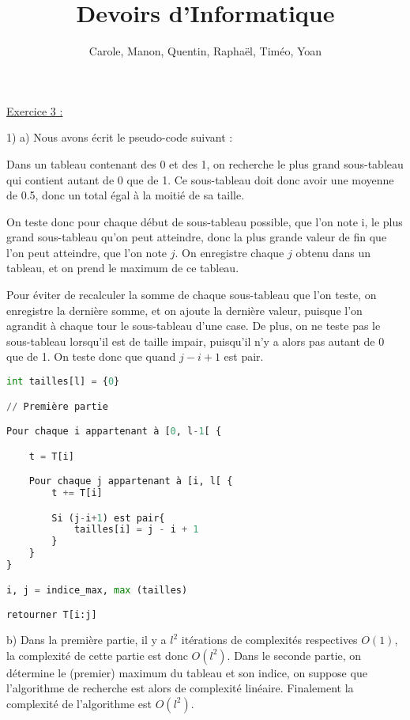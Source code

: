 \documentclass{article}
\title{Devoirs d'Informatique}
\author{Carole, Manon, Quentin, Raphaël, Timéo, Yoan}
\begin{document}
\maketitle

\underline{Exercice 3 :}

\bigskip
\bigskip
\bigskip

1) a) Nous avons écrit le pseudo-code suivant :

\bigskip
\bigskip

Dans un tableau contenant des 0 et des 1, on recherche le plus grand sous-tableau qui contient autant de 0 que de 1. Ce sous-tableau doit donc avoir une moyenne de 0.5, donc un total égal à la moitié de sa taille.

On teste donc pour chaque début de sous-tableau possible, que l'on note i, le plus grand sous-tableau qu'on peut atteindre, donc la plus grande valeur de fin que l'on peut atteindre, que l'on note $j$. On enregistre chaque $j$ obtenu dans un tableau, et on prend le maximum de ce tableau.


Pour éviter de recalculer la somme de chaque sous-tableau que l'on teste, on enregistre la dernière somme, et on ajoute la dernière valeur, puisque l'on agrandit à chaque tour le sous-tableau d'une case. De plus, on ne teste pas le sous-tableau lorsqu'il est de taille impair, puisqu'il n'y a alors pas autant de 0 que de 1. On teste donc que quand $j-i+1$ est pair.

\begin{lstlisting}[language=Python]
int tailles[l] = {0}

// Première partie

Pour chaque i appartenant à [0, l-1[ {

    t = T[i]

    Pour chaque j appartenant à [i, l[ {
        t += T[i]

        Si (j-i+1) est pair{
            tailles[i] = j - i + 1
        }
    }
}

i, j = indice_max, max (tailles)

retourner T[i:j]
\end{lstlisting}

\bigskip
\bigskip

b) Dans la première partie, il y a $l^2$ itérations de complexités respectives $O(1)$, la complexité de cette partie est donc $O(l^2)$. Dans le seconde partie, on détermine le (premier) maximum du tableau et son indice, on suppose que l'algorithme de recherche est alors de complexité linéaire. Finalement la complexité de l'algorithme est $O(l^2)$.
\end{document}
